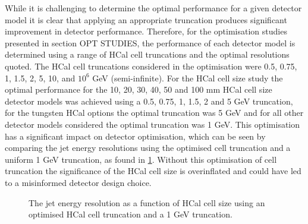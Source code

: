 While it is challenging to determine the optimal performance for a given detector model it is clear that applying an appropriate truncation produces significant improvement in detector performance.  Therefore, for the optimisation studies presented in section OPT STUDIES, the performance of each detector model is determined using a range of HCal cell truncations and the optimal resolutions quoted.  The HCal cell truncations considered in the optimisation were 0.5, 0.75, 1, 1.5, 2, 5, 10, and $10^{6}$ GeV (semi-infinite).  For the HCal cell size study the optimal performance for the 10, 20, 30, 40, 50 and 100 mm HCal cell size detector models was achieved using a 0.5, 0.75, 1, 1.5, 2 and 5 GeV truncation, for the tungsten HCal options the optimal truncation was 5 GeV and for all other detector models considered the optimal truncation was 1 GeV.  This optimisation has a significant impact on detector optimisation, which can be seen by comparing the jet energy resolutions using the optimised cell truncation and a uniform 1 GeV truncation, as found in \ref{fig:jerhcalcellopt}.  Without this optimisation of cell truncation the significance of the HCal cell size is overinflated and could have led to a misinformed detector design choice.  

\begin{figure}
\caption[The jet energy resolution as a function of HCal cell size using \protect{} an optimised HCal cell truncation and \protect{} a fixed 1 GeV truncation.]{The jet energy resolution as a function of HCal cell size using \protect{} an optimised HCal cell truncation and \protect{} a 1 GeV truncation.}
\label{fig:jerhcalcellopt}
\end{figure}

